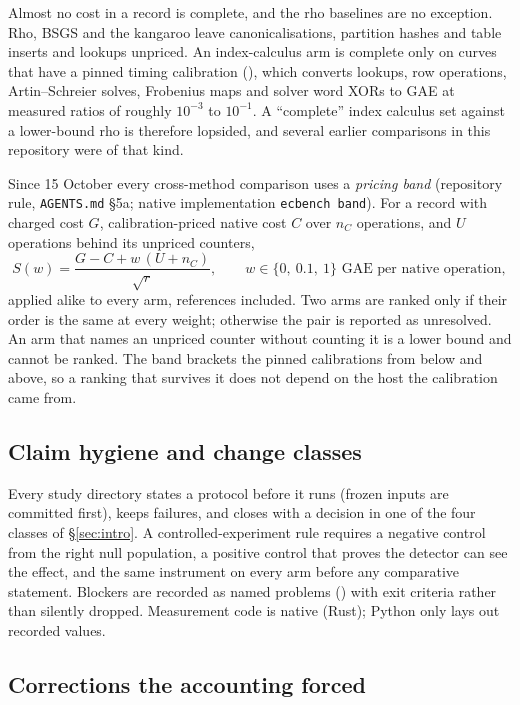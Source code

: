 Almost no cost in a record is complete, and the rho baselines are no
exception. Rho, BSGS and the kangaroo leave canonicalisations, partition
hashes and table inserts and lookups unpriced. An index-calculus arm is
complete only on curves that have a pinned timing calibration
(), which converts lookups, row operations,
Artin--Schreier solves, Frobenius maps and solver word XORs to GAE at
measured ratios of roughly $10^{-3}$ to $10^{-1}$. A ``complete'' index
calculus set against a lower-bound rho is therefore lopsided, and several
earlier comparisons in this repository were of that kind.

Since 15 October every cross-method comparison uses a \emph{pricing band}
(repository rule, \texttt{AGENTS.md} \S5a; native implementation
\texttt{ecbench band}). For a record with charged cost $G$, calibration-priced
native cost $C$ over $n_C$ operations, and $U$ operations behind its
unpriced counters,
\[
  S(w)=\frac{G-C+w\,(U+n_C)}{\sqrt r},\qquad w\in\{0,\ 0.1,\ 1\}
  \text{ GAE per native operation},
\]
applied alike to every arm, references included. Two arms are ranked only
if their order is the same at every weight; otherwise the pair is reported
as unresolved. An arm that names an unpriced counter without counting it is
a lower bound and cannot be ranked. The band brackets the pinned
calibrations from below and above, so a ranking that survives it does not
depend on the host the calibration came from.

\subsection{Claim hygiene and change classes}

Every study directory states a protocol before it runs (frozen inputs are
committed first), keeps failures, and closes with a decision in one of the
four classes of \S\ref{sec:intro}. A controlled-experiment rule requires a
negative control from the right null population, a positive control that
proves the detector can see the effect, and the same instrument on every
arm before any comparative statement. Blockers are recorded as named
problems () with exit criteria rather than silently dropped.
Measurement code is native (Rust); Python only lays out recorded values.

\subsection{Corrections the accounting forced}\label{sec:corrections}

